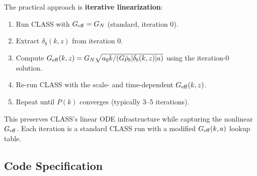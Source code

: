 \documentclass[11pt]{article}
\theoremstyle{definition}
\theoremstyle{remark}
\newcommand{\Geff}{G_{\rm eff}}
\begin{document}
The practical approach is \textbf{iterative linearization}:
\begin{enumerate}
\item Run CLASS with $\Geff = G_N$ (standard, iteration 0).
\item Extract $\delta_b(k,z)$ from iteration 0.
\item Compute $\Geff(k,z) = G_N \sqrt{a_0 k / (G\bar\rho_b
  |\delta_b(k,z)| a)}$ using the iteration-0 solution.
\item Re-run CLASS with the scale- and time-dependent $\Geff(k,z)$.
\item Repeat until $P(k)$ converges (typically 3--5 iterations).
\end{enumerate}

This preserves CLASS's linear ODE infrastructure while capturing the
nonlinear $\Geff$. Each iteration is a standard CLASS run with a
modified $\Geff(k,a)$ lookup table.

\subsection{Code Specification}
\end{document}
